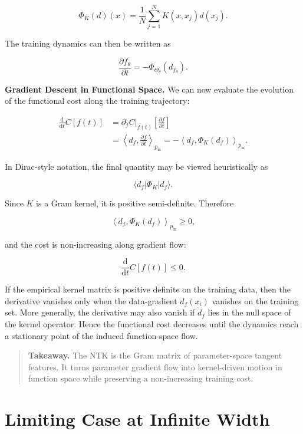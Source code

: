 \[
\Phi_K(d)(x)
=
\frac{1}{N}
\sum_{j=1}^{N}
K(x,x_j)d(x_j).
\]

The training dynamics can then be written as

\[
\frac{\partial f_\theta}{\partial t}
=
-
\Phi_{\Theta_\theta}(d_{f_\theta}).
\label{keyeq:function-space-dynamics}
\]

\textbf{Gradient Descent in Functional Space.} We can now evaluate the evolution of the functional cost along the training trajectory:

\[
\begin{aligned}
\frac{\mathrm{d}}{\mathrm{d}t} C[f(t)]
&=
\partial_f C\big|_{f(t)}
\left[
\frac{\partial f}{\partial t}
\right] \\[0.5em]
&=
\left\langle
d_f,
\frac{\partial f}{\partial t}
\right\rangle_{p_{\mathrm{in}}} =
-
\left\langle
d_f,
\Phi_K(d_f)
\right\rangle_{p_{\mathrm{in}}}.
\end{aligned}
\]

In Dirac-style notation, the final quantity may be viewed heuristically as

\[
\langle d_f | \Phi_K | d_f \rangle.
\]

Since \(K\) is a Gram kernel, it is positive semi-definite. Therefore

\[
\left\langle
d_f,
\Phi_K(d_f)
\right\rangle_{p_{\mathrm{in}}}
\geq 0,
\]

and the cost is non-increasing along gradient flow:

\[
\frac{\mathrm{d}}{\mathrm{d}t} C[f(t)] \leq 0.
\]

If the empirical kernel matrix is positive definite on the training data, then the derivative vanishes only when the data-gradient \(d_f(x_i)\) vanishes on the training set. More generally, the derivative may also vanish if \(d_f\) lies in the null space of the kernel operator. Hence the functional cost decreases until the dynamics reach a stationary point of the induced function-space flow.

\begin{quote}
\textbf{Takeaway.} The NTK is the Gram matrix of parameter-space tangent features. It turns parameter gradient flow into kernel-driven motion in function space while preserving a non-increasing training cost.
\end{quote}

\section{Limiting Case at Infinite Width}

